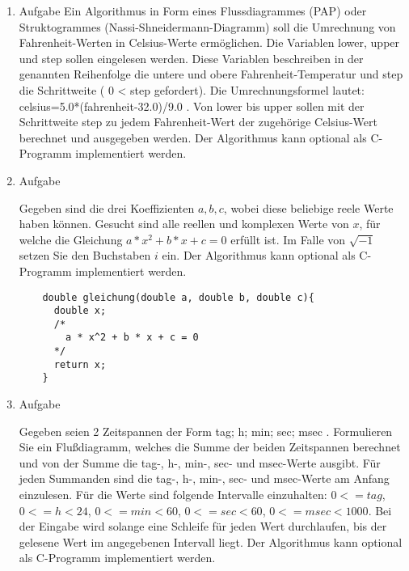 \documentclass[12pt,a4paper]{scrreprt}
\begin{document}
\begin{enumerate}
\item Aufgabe %
Ein Algorithmus in Form eines Flussdiagrammes (PAP) oder Struktogrammes (Nassi-Shneidermann-Diagramm) soll die Umrechnung von Fahrenheit-Werten in Celsius-Werte ermöglichen. Die Variablen lower, upper und step sollen eingelesen werden. Diese Variablen beschreiben in der genannten Reihenfolge die untere und obere Fahrenheit-Temperatur und step die Schrittweite ( 0 < step gefordert). Die Umrechnungsformel lautet: celsius=5.0*(fahrenheit-32.0)/9.0 .
Von lower bis upper sollen mit der Schrittweite step zu jedem Fahrenheit-Wert der zugehörige Celsius-Wert berechnet und ausgegeben werden. Der Algorithmus kann optional als C-Programm implementiert werden.

\begin{comment}
    (1)_Start
    (2)_Input:lower 
    (1)->(2)
    (3)_Input:upper
    (2)->(3)
    (4)_Input:step 
    (3)->(4)
    (6)_Output:(lower-32.0)/1.8  //ungekürzt: 5.0*(fahrenheit-32.0)/9.0
    (4)->(5)
    (5)_If(0 < step)?(5)->(6)
    (5)->(4)
    (7)_Set:lower+=step
    (6)->(7)
    (9)_End
    (8)_If(lower < upper)?(8)->(6)
    (8)->(9)
\end{comment}

\item Aufgabe %

Gegeben sind die drei Koeffizienten $ a, b, c$, wobei diese beliebige reele Werte haben können. Gesucht sind alle reellen und komplexen Werte von $ x $, für welche die Gleichung $ a * x^2 + b * x + c = 0 $ erfüllt ist. Im Falle von $ \sqrt{-1} $ setzen Sie den Buchstaben $ i $ ein.
Der Algorithmus kann optional als C-Programm implementiert werden.

\begin{lstlisting}
    double gleichung(double a, double b, double c){
      double x;
      /*
        a * x^2 + b * x + c = 0
      */
      return x;
    }
\end{lstlisting}

\item Aufgabe %

Gegeben seien 2 Zeitspannen der Form tag; h; min; sec; msec . Formulieren Sie ein Flußdiagramm, welches die Summe der beiden Zeitspannen berechnet und von der Summe die tag-, h-, min-, sec- und msec-Werte ausgibt. Für jeden Summanden sind die tag-, h-, min-, sec- und msec-Werte am Anfang einzulesen. Für die Werte sind folgende Intervalle einzuhalten: $ 0<=tag$, $ 0 <= h<24$, $ 0<= min < 60 $, $ 0<= sec < 60$, $ 0<= msec < 1000$. Bei der Eingabe wird solange eine Schleife für jeden Wert durchlaufen, bis der gelesene Wert im angegebenen Intervall liegt. Der Algorithmus kann optional als C-Programm implementiert werden.


\end{enumerate}
\end{document}
